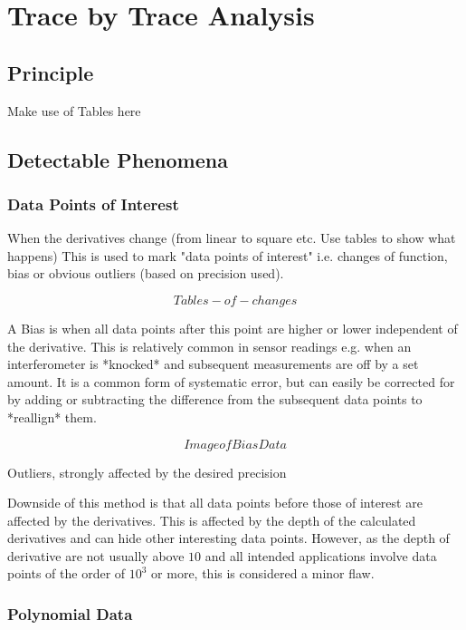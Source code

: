 \documentclass[main.tex]{subfiles}
\begin{document}
  
  \section{Trace by Trace Analysis}
  \subsection{Principle}
  Make use of Tables here
  
  \subsection{Detectable Phenomena}
  
  \subsubsection{Data Points of Interest}
  When the derivatives change (from linear to square etc. Use tables to show what happens) This is used to mark "data points of interest" i.e. changes of function, bias or obvious outliers (based on precision used).
  
  \[Tables-of-changes\]
  
  A Bias is when all data points after this point are higher or lower independent of the derivative. This is relatively common in sensor readings e.g. when an interferometer is *knocked* and subsequent measurements are off by a set amount. It is a common form of systematic error, but can easily be corrected for by adding or subtracting the difference from the subsequent data points to *reallign* them.
  
  \[Image of Bias Data\]
  
  Outliers,  strongly affected by the desired precision
  
  Downside of this method is that all data points before those of interest are affected by the derivatives. This is affected by the depth of the calculated derivatives and can hide other interesting data points. However, as the depth of derivative are not usually above $10$ and all intended applications involve data points of the order of $10^3$ or more, this is considered a minor flaw.
  
  \subsubsection{Polynomial Data}
  
\end{document}
